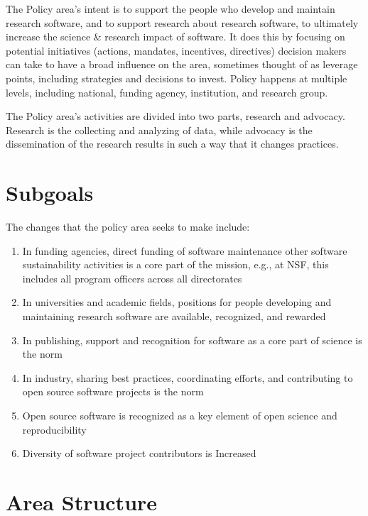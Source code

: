 \documentclass[
]{book}
\begin{document}
The Policy area's intent is to support the people who develop and maintain research software, and to
support research about research software, to ultimately increase the science \& research impact of
software. It does this by focusing on potential initiatives (actions, mandates, incentives, directives)
decision makers can take to have a broad influence on the area, sometimes thought of as leverage points,
including strategies and decisions to invest. Policy happens at multiple levels, including national,
funding agency, institution, and research group.

The Policy area's activities are divided into two parts, research and advocacy. Research is the collecting
and analyzing of data, while advocacy is the dissemination of the research results in such a way that it
changes practices.

\hypertarget{subgoals}{%
\section{Subgoals}\label{subgoals}}

The changes that the policy area seeks to make include:

\begin{enumerate}
\def\labelenumi{\arabic{enumi}.}
\item
  In funding agencies, direct funding of software maintenance other software sustainability activities
  is a core part of the mission, e.g., at NSF, this includes all program officers across all directorates
\item
  In universities and academic fields, positions for people developing and maintaining research software
  are available, recognized, and rewarded
\item
  In publishing, support and recognition for software as a core part of science is the norm
\item
  In industry, sharing best practices, coordinating efforts, and contributing to open source software
  projects is the norm
\item
  Open source software is recognized as a key element of open science and reproducibility
\item
  Diversity of software project contributors is Increased
\end{enumerate}

\hypertarget{area-structure}{%
\section{Area Structure}\label{area-structure}}
\end{document}
